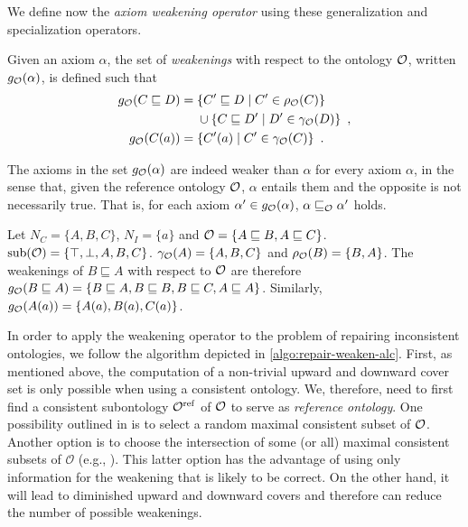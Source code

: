 We define now the \emph{axiom weakening operator} using these generalization and specialization operators.

\begin{definition}
  Given an axiom $\alpha$, the set of \emph{weakenings} with respect to the ontology $\mathcal{O}$, written $g_\mathcal{O}(\alpha)$, is defined such that
  \begin{align*}
    g_\mathcal{O}(C \sqsubseteq D) ={} & \{ C' \sqsubseteq D \mid C' \in \rho_\mathcal{O} (C) \} \\
    & \cup \{ C \sqsubseteq D' \mid D' \in \gamma_\mathcal{O}(D) \} \enspace, \\
    g_\mathcal{O}(C(a)) ={} & \{ C'(a) \mid C' \in \gamma_\mathcal{O}(C) \} \enspace.
  \end{align*}
\end{definition}

The axioms in the set $g_\mathcal{O}(\alpha)$ are indeed weaker than $\alpha$ for every axiom $\alpha$, in the sense that, given the reference ontology $\mathcal{O}$, $\alpha$ entails them and the opposite is not necessarily true. That is, for each axiom $\alpha' \in g_\mathcal{O}(\alpha)$, $\alpha \sqsubseteq_\mathcal{O} \alpha'$ holds.

\begin{example}
  Let $N_C = \{ A, B, C \}$, $N_I = \{ a \}$ and $\mathcal{O} = \{ A \sqsubseteq B, A \sqsubseteq C \}$. ${\operatorname{sub}}(\mathcal{O}) = \{\top, \bot, A, B, C\}$. $\gamma_\mathcal{O}(A) = \{ A, B, C \}$ and $\rho_\mathcal{O}(B) = \{ B, A \}$. The weakenings of $B \sqsubseteq A$ with respect to $\mathcal{O}$ are therefore $g_\mathcal{O}(B \sqsubseteq A) = \{ B \sqsubseteq A, B \sqsubseteq B, B \sqsubseteq C, A \sqsubseteq A \}$. Similarly, $g_\mathcal{O}(A(a)) = \{ A(a), B(a), C(a) \}$.
\end{example}

In order to apply the weakening operator to the problem of repairing inconsistent ontologies, we follow the algorithm depicted in \cref{algo:repair-weaken-alc}. First, as mentioned above, the computation of a non-trivial upward and downward cover set is only possible when using a consistent ontology. We, therefore, need to first find a consistent subontology ${\mathcal{O}^\textnormal{ref}}$ of $\mathcal{O}$ to serve as \emph{reference ontology}. One possibility outlined in \cite{troquard2018repairing} is to select a random maximal consistent subset of $\mathcal{O}$. Another option is to choose the intersection of some (or all) maximal consistent subsets of $\mathcal{O}$ (e.g., \cite{LLRRS10}). This latter option has the advantage of using only information for the weakening that is likely to be correct. On the other hand, it will lead to diminished upward and downward covers and therefore can reduce the number of possible weakenings.

